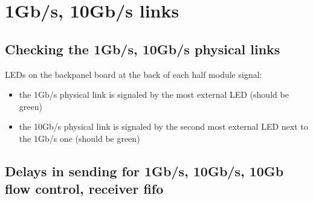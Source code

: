\documentclass{article}
\begin{document}
\section{1Gb/s, 10Gb/s links}
\subsection{Checking the 1Gb/s, 10Gb/s physical links}\label{led}
LEDs on the backpanel board at the back of each half module signal:
\begin{itemize}
\item  the 1Gb/s physical link is signaled by the most external LED (should be green) 
\item the 10Gb/s physical link is signaled by the second most external LED next to the 1Gb/s one (should be green) 
\end{itemize}

\subsection{Delays in sending for 1Gb/s, 10Gb/s, 10Gb flow control, receiver fifo}
\end{document}
